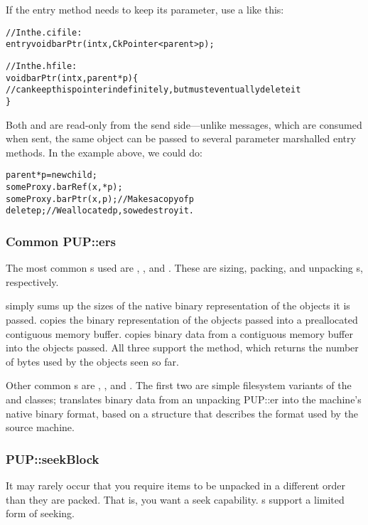 If the entry method needs to keep its parameter, use a  like this:
\begin{alltt}
// In the .ci file:
    entry void barPtr(int x,CkPointer<parent> p);

// In the .h file:
    void barPtr(int x,parent *p) \{
      // can keep this pointer indefinitely, but must eventually delete it
    \}
\end{alltt}

Both  and  are read-only from the send 
side---unlike messages, which are consumed when sent, the same object 
can be passed to several parameter marshalled entry methods.
In the example above, we could do:

\begin{alltt}
   parent *p=new child;
   someProxy.barRef(x,*p);
   someProxy.barPtr(x,p); // Makes a copy of p
   delete p; // We allocated p, so we destroy it.
\end{alltt}


\subsubsection{Common PUP::ers}
The most common s used are ,
, and .  These are sizing,
packing, and unpacking s, respectively.

 simply sums up the sizes of the native
binary representation of the objects it is passed.
 copies the binary representation of the
objects passed into a preallocated contiguous memory buffer.
 copies binary data from a contiguous memory
buffer into the objects passed.  All three support the
 method, which returns the number of bytes used
by the objects seen so far.

Other common s are , 
, and .  The first
two are simple filesystem variants of the  
and  classes;  translates
binary data from an unpacking PUP::er into the machine's
native binary format, based on a  structure
that describes the format used by the source machine.


\subsubsection{PUP::seekBlock}
It may rarely occur that you require items to be unpacked
in a different order than they are packed.  That is, you
want a seek capability.  s support a limited 
form of seeking.

